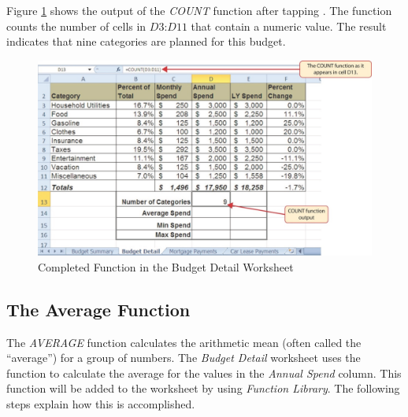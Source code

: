 Figure \ref{02:fig18} shows the output of the \textit{COUNT} function after tapping . The function counts the number of cells in $ D3 $:$ D11 $ that contain a numeric value. The result indicates that nine categories are planned for this budget.

\begin{figure}[H]
	\centering
	\includegraphics[width=\maxwidth{.95\linewidth}]{gfx/ch02_fig18}
	\caption{Completed  Function in the Budget Detail Worksheet}
	\label{02:fig18}
\end{figure}

\subsection{The Average Function}

The \textit{AVERAGE} function calculates the arithmetic mean (often called the ``average'') for a group of numbers. The \textit{Budget Detail} worksheet uses the function to calculate the average for the values in the \textit{Annual Spend} column. This function will be added to the worksheet by using \textit{Function Library}. The following steps explain how this is accomplished.

